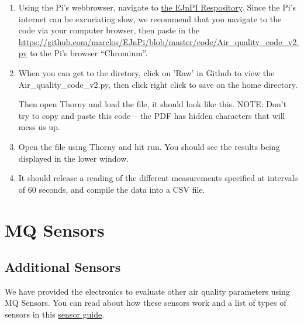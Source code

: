 \documentclass{article}
\begin{document}
\begin{enumerate}

\item Using the Pi's webbrowser, navigate to \href{https://github.com/marclos/EJnPi/tree/master/code}{the EJnPI Respository}. Since the Pi's internet can be excuriating slow, we recommend that you navigate to the code via your computer browser, then paste in the \url{https://github.com/marclos/EJnPi/blob/master/code/Air_quality_code_v2.py} to the Pi's browser ``Chromium''. 

\item When you can get to the diretory, click on 'Raw' in Github to view the Air\_quality\_code\_v2.py, then click right click to save on the home directory.

Then open Thorny and load the file, it should look like this. NOTE: Don't try to copy and paste this code -- the PDF has hidden characters that will mess us up.



\item Open the file using Thorny and hit run. You should see the results being displayed in the lower window.



\item It should release a reading of the different measurements specified at intervals of 60 seconds, and compile the data into a CSV file.

\end{enumerate}
\clearpage

\section{MQ Sensors}

\subsection{Additional Sensors}

We have provided the electronics to evaluate other air quality parameters using MQ Sensors. You can read about how these sensors work and a list of types of sensors in this \href{http://github...}{sensor guide}.
\end{document}
